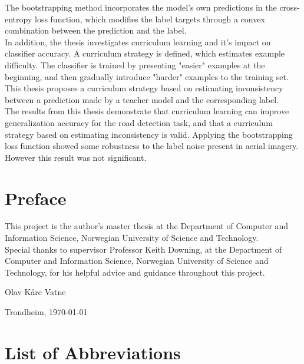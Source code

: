\documentclass[a4paper]{book}
\newcommand{\thesisAuthor}{Olav Kåre Vatne}
\begin{document}
The bootstrapping method incorporates the model's  own predictions in the cross-entropy loss function, which modifies the label targets through a convex combination between the prediction and the label.\\

In addition, the thesis investigates curriculum learning and it's impact on classifier accuracy. A curriculum strategy is defined, which estimates example difficulty. The classifier is trained by presenting "easier" examples at the beginning, and then gradually introduce "harder" examples to the training set. This thesis proposes a curriculum strategy based on estimating inconsistency between a prediction made by a teacher model and the corresponding label.\\

The results from this thesis demonstrate that curriculum learning can improve generalization accuracy for the road detection task, and that a curriculum strategy based on estimating inconsistency is valid. Applying the bootstrapping loss function showed some robustness to the label noise present in aerial imagery. However this result was not significant.

\clearpage

\section*{Preface}
\vspace{1cm}

This project is the author's master thesis at the Department of Computer and Information
Science, Norwegian University of Science and Technology. \\

Special thanks to supervisor Professor Keith Downing, at the Department of Computer
and Information Science, Norwegian University of Science and Technology, for his
helpful advice and guidance throughout this project. \\



\vfill

\hfill \thesisAuthor

\hfill Trondheim, \today

\clearpage

\section*{List of Abbreviations}
\vspace{1cm}
\begin{acronym}
\end{acronym}
\end{document}
